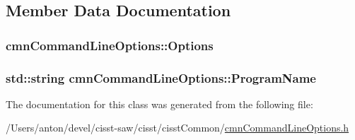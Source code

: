 \subsection{Member Data Documentation}
\hypertarget{classcmn_command_line_options_a921f64221c35be2f04cb23d5d2a2952f}{}
\subsubsection[{Options}]{ cmn\+Command\+Line\+Options\+::\+Options\hspace{0.3cm}{\ttfamily [protected]}}\label{classcmn_command_line_options_a921f64221c35be2f04cb23d5d2a2952f}
\hypertarget{classcmn_command_line_options_a3bd5b3dce4d3b8b3f9010d387513f8cb}{}
\subsubsection[{Program\+Name}]{\setlength{\rightskip}{0pt plus 5cm}std\+::string cmn\+Command\+Line\+Options\+::\+Program\+Name\hspace{0.3cm}{\ttfamily [protected]}}\label{classcmn_command_line_options_a3bd5b3dce4d3b8b3f9010d387513f8cb}


The documentation for this class was generated from the following file\+:\begin{DoxyCompactItemize}
\item 
/\+Users/anton/devel/cisst-\/saw/cisst/cisst\+Common/\hyperlink{cmn_command_line_options_8h}{cmn\+Command\+Line\+Options.\+h}\end{DoxyCompactItemize}
